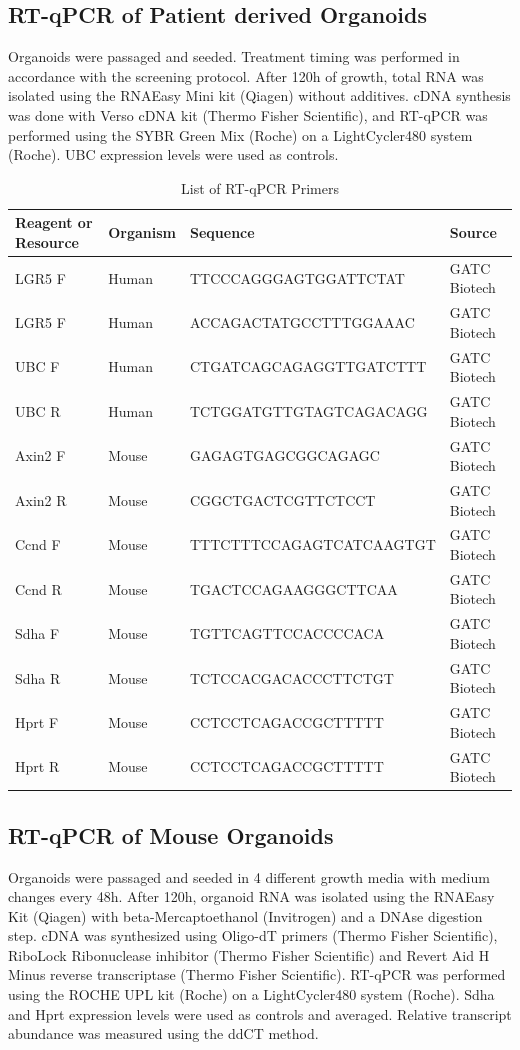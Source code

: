 \begin{flushleft}
\subsection{RT-qPCR of Patient derived Organoids}
Organoids were passaged and seeded. Treatment timing was performed in accordance with the screening protocol. After 120h of growth, total RNA was isolated using the RNAEasy Mini kit (Qiagen) without additives. cDNA synthesis was done with Verso cDNA kit (Thermo Fisher Scientific), and RT-qPCR was performed using the SYBR Green Mix (Roche) on a LightCycler480 system (Roche). UBC expression levels were used as controls.

\begin{table}[htb]
\caption{List of RT-qPCR Primers}
\label{tab:qpcr} %
\begin{tabularx}{\textwidth}{lXll}
\toprule
\textbf{Reagent or Resource} & \textbf{Organism} & \textbf{Sequence} & \textbf{Source} \\
\midrule
LGR5 F & Human & TTCCCAGGGAGTGGATTCTAT & GATC Biotech \\
LGR5 F & Human & ACCAGACTATGCCTTTGGAAAC & GATC Biotech \\
UBC F & Human & CTGATCAGCAGAGGTTGATCTTT & GATC Biotech \\
UBC R & Human & TCTGGATGTTGTAGTCAGACAGG & GATC Biotech \\
Axin2 F & Mouse & GAGAGTGAGCGGCAGAGC & GATC Biotech \\
Axin2 R & Mouse & CGGCTGACTCGTTCTCCT & GATC Biotech \\
Ccnd F & Mouse & TTTCTTTCCAGAGTCATCAAGTGT & GATC Biotech \\
Ccnd R & Mouse & TGACTCCAGAAGGGCTTCAA & GATC Biotech \\
Sdha F & Mouse & TGTTCAGTTCCACCCCACA & GATC Biotech \\
Sdha R & Mouse & TCTCCACGACACCCTTCTGT & GATC Biotech \\
Hprt F & Mouse & CCTCCTCAGACCGCTTTTT & GATC Biotech \\
Hprt R & Mouse & CCTCCTCAGACCGCTTTTT & GATC Biotech \\
\bottomrule
\end{tabularx}
\end{table}

\subsection{RT-qPCR of Mouse Organoids}
Organoids were passaged and seeded in 4 different growth media with medium changes every 48h. After 120h, organoid RNA was isolated using the RNAEasy Kit (Qiagen) with beta-Mercaptoethanol (Invitrogen) and a DNAse digestion step. cDNA was synthesized using Oligo-dT primers (Thermo Fisher Scientific), RiboLock Ribonuclease inhibitor (Thermo Fisher Scientific) and Revert Aid H Minus reverse transcriptase (Thermo Fisher Scientific). RT-qPCR was performed using the ROCHE UPL kit (Roche) on a LightCycler480 system (Roche). Sdha and Hprt expression levels were used as controls and averaged. Relative transcript abundance was measured using the ddCT method.
 

\end{flushleft}
